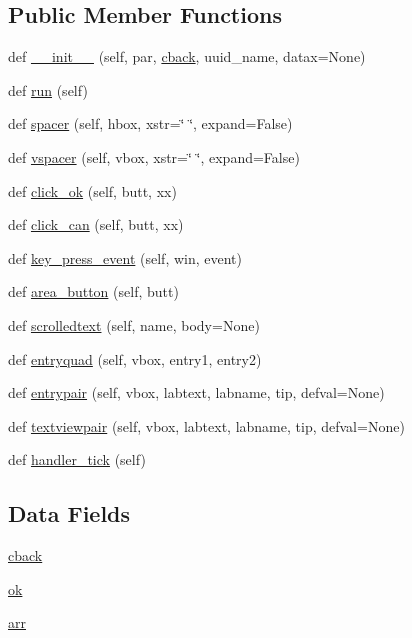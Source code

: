 \subsection*{Public Member Functions}
\begin{DoxyCompactItemize}
\item 
def \hyperlink{classnewcust_1_1_new_cust_a6525fc41c20a15b5679d6c1b25ed6382}{\+\_\+\+\_\+init\+\_\+\+\_\+} (self, par, \hyperlink{classnewcust_1_1_new_cust_a599b5ba47e46802f9612991a1671b10d}{cback}, uuid\+\_\+name, datax=None)
\item 
def \hyperlink{classnewcust_1_1_new_cust_ad22709b2e67308af35f55680d5a026e0}{run} (self)
\item 
def \hyperlink{classnewcust_1_1_new_cust_a90898fd7a9cd186cdf5049af48358987}{spacer} (self, hbox, xstr=\char`\"{}    \char`\"{}, expand=False)
\item 
def \hyperlink{classnewcust_1_1_new_cust_a0dac401bad64932c202b80373a8b8204}{vspacer} (self, vbox, xstr=\char`\"{}     \char`\"{}, expand=False)
\item 
def \hyperlink{classnewcust_1_1_new_cust_a52808e81a3a13f8152d1915c83f101ae}{click\+\_\+ok} (self, butt, xx)
\item 
def \hyperlink{classnewcust_1_1_new_cust_a2340f5763bb2cb8bb86f00d1f7af196c}{click\+\_\+can} (self, butt, xx)
\item 
def \hyperlink{classnewcust_1_1_new_cust_ade844b0d29257631707c9cf4374d65b2}{key\+\_\+press\+\_\+event} (self, win, event)
\item 
def \hyperlink{classnewcust_1_1_new_cust_ac8f0164ed23b47c62b9bf93f8dfddba8}{area\+\_\+button} (self, butt)
\item 
def \hyperlink{classnewcust_1_1_new_cust_a44d5d34e5cf3202869ac1d4c4a991506}{scrolledtext} (self, name, body=None)
\item 
def \hyperlink{classnewcust_1_1_new_cust_aa439dd5761c7e8e65f3d333652744af9}{entryquad} (self, vbox, entry1, entry2)
\item 
def \hyperlink{classnewcust_1_1_new_cust_a7c7269fccea3b838ca0c7580277ef8d9}{entrypair} (self, vbox, labtext, labname, tip, defval=None)
\item 
def \hyperlink{classnewcust_1_1_new_cust_ab063a0c78082406f614cdd9aaef1531f}{textviewpair} (self, vbox, labtext, labname, tip, defval=None)
\item 
def \hyperlink{classnewcust_1_1_new_cust_a22fab0ca18f0c6d3a657200fc3af5a52}{handler\+\_\+tick} (self)
\end{DoxyCompactItemize}
\subsection*{Data Fields}
\begin{DoxyCompactItemize}
\item 
\hyperlink{classnewcust_1_1_new_cust_a599b5ba47e46802f9612991a1671b10d}{cback}
\item 
\hyperlink{classnewcust_1_1_new_cust_ab73fdaa1fb7669da760b49600c45d9be}{ok}
\item 
\hyperlink{classnewcust_1_1_new_cust_a6315dfe6e05d2814c94e9eb9a5eab999}{arr}
\end{DoxyCompactItemize}


